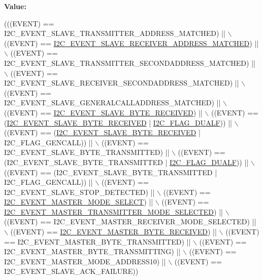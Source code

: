 {\bfseries Value\+:}
\begin{DoxyCode}
(((EVENT) == I2C\_EVENT\_SLAVE\_TRANSMITTER\_ADDRESS\_MATCHED) || \(\backslash\)
                             ((EVENT) == 
      \mbox{\hyperlink{group___i2_c___events_ga6cf0e334704618b024eee604849f50f7}{I2C\_EVENT\_SLAVE\_RECEIVER\_ADDRESS\_MATCHED}}) || \(\backslash\)
                             ((EVENT) == I2C\_EVENT\_SLAVE\_TRANSMITTER\_SECONDADDRESS\_MATCHED) || \(\backslash\)
                             ((EVENT) == I2C\_EVENT\_SLAVE\_RECEIVER\_SECONDADDRESS\_MATCHED) || \(\backslash\)
                             ((EVENT) == I2C\_EVENT\_SLAVE\_GENERALCALLADDRESS\_MATCHED) || \(\backslash\)
                             ((EVENT) == \mbox{\hyperlink{group___i2_c___events_ga8b244626839940569c6c8bbfc4efe21d}{I2C\_EVENT\_SLAVE\_BYTE\_RECEIVED}}) || \(\backslash\)
                             ((EVENT) == (\mbox{\hyperlink{group___i2_c___events_ga8b244626839940569c6c8bbfc4efe21d}{I2C\_EVENT\_SLAVE\_BYTE\_RECEIVED}} | 
      \mbox{\hyperlink{group___i2_c__flags__definition_ga3755b783aa73568659478c2e2e45e27f}{I2C\_FLAG\_DUALF}})) || \(\backslash\)
                             ((EVENT) == (\mbox{\hyperlink{group___i2_c___events_ga8b244626839940569c6c8bbfc4efe21d}{I2C\_EVENT\_SLAVE\_BYTE\_RECEIVED}} | 
      I2C\_FLAG\_GENCALL)) || \(\backslash\)
                             ((EVENT) == I2C\_EVENT\_SLAVE\_BYTE\_TRANSMITTED) || \(\backslash\)
                             ((EVENT) == (I2C\_EVENT\_SLAVE\_BYTE\_TRANSMITTED | 
      \mbox{\hyperlink{group___i2_c__flags__definition_ga3755b783aa73568659478c2e2e45e27f}{I2C\_FLAG\_DUALF}})) || \(\backslash\)
                             ((EVENT) == (I2C\_EVENT\_SLAVE\_BYTE\_TRANSMITTED | I2C\_FLAG\_GENCALL)) || \(\backslash\)
                             ((EVENT) == I2C\_EVENT\_SLAVE\_STOP\_DETECTED) || \(\backslash\)
                             ((EVENT) == \mbox{\hyperlink{group___i2_c___events_gaeef8c22ac035122b06e31b360ac7aeb3}{I2C\_EVENT\_MASTER\_MODE\_SELECT}}) || \(\backslash\)
                             ((EVENT) == 
      \mbox{\hyperlink{group___i2_c___events_ga2361a6e60b7dc86fb682dd06fbd3edb7}{I2C\_EVENT\_MASTER\_TRANSMITTER\_MODE\_SELECTED}}) || \(\backslash\)
                             ((EVENT) == I2C\_EVENT\_MASTER\_RECEIVER\_MODE\_SELECTED) || \(\backslash\)
                             ((EVENT) == \mbox{\hyperlink{group___i2_c___events_ga6bcf2ae49961e07e27cf9fdf334719e3}{I2C\_EVENT\_MASTER\_BYTE\_RECEIVED}}) || \(\backslash\)
                             ((EVENT) == I2C\_EVENT\_MASTER\_BYTE\_TRANSMITTED) || \(\backslash\)
                             ((EVENT) == I2C\_EVENT\_MASTER\_BYTE\_TRANSMITTING) || \(\backslash\)
                             ((EVENT) == I2C\_EVENT\_MASTER\_MODE\_ADDRESS10) || \(\backslash\)
                             ((EVENT) == I2C\_EVENT\_SLAVE\_ACK\_FAILURE))
\end{DoxyCode}
